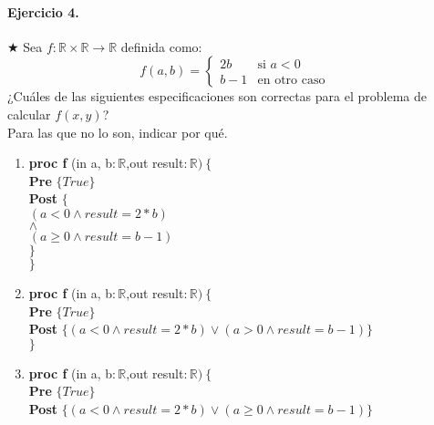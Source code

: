 \documentclass[a4paper]{article}
\begin{document}
\paragraph*{Ejercicio 4.}$\bigstar$ Sea $f:\mathbb{R}\times \mathbb{R}\rightarrow \mathbb{R}$ definida como:\\
\[ f(a,b)=\left\{ \begin{array}{ll}
			2b  & \textrm{si } a < 0\\
			b-1 & \textrm{en otro caso }
		\end{array}\right.
\]
¿Cuáles de las siguientes especificaciones son correctas para el problema de calcular $f(x,y)$?\\
Para las que no lo son, indicar por qué.\bigskip \\
	\begin{enumerate}[label=\alph*)]
		\item
			\textbf{proc f }(in a, b$: \mathbb{R}$,out result$:\mathbb{R})\ \{$\smallskip \\
			\hspace*{6mm} \textbf{Pre }$\{ True\}$\smallskip \\
			\hspace*{6mm} \textbf{Post }$\{$\\
			\hspace*{6mm} $(a < 0 \wedge result=2*b)$\\
			\hspace*{6mm} $\wedge$\\
			\hspace*{6mm} $(a \geq 0 \wedge result=b-1)$\\			
			\hspace*{6mm}$\}$\\
			$\}$
		\item
			\textbf{proc f }(in a, b$: \mathbb{R}$,out result$:\mathbb{R})\ \{$\smallskip \\
			\hspace*{6mm} \textbf{Pre }$\{ True\}$\smallskip \\
			\hspace*{6mm} \textbf{Post }$\{(a<0 \wedge result=2*b)\vee (a> 0 \wedge result=b-1)\}$\\
			$\}$
		\item
			\textbf{proc f }(in a, b$: \mathbb{R}$,out result$:\mathbb{R})\ \{$\smallskip \\
			\hspace*{6mm} \textbf{Pre }$\{ True\}$\smallskip \\
			\hspace*{6mm} \textbf{Post }$\{(a<0 \wedge result=2*b)\vee (a\geq 0 \wedge result=b-1)\}$\\

\end{enumerate}
\end{document}

